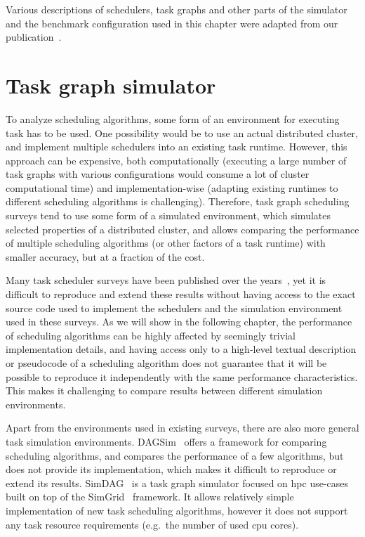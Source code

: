 Various descriptions of schedulers, task graphs and other parts of the simulator and the benchmark
configuration used in this chapter were adapted from our publication~\cite{estee}.


\section{Task graph simulator}
\label{sec:estee-simulator}
To analyze scheduling algorithms, some form of an environment for executing task has to be used.
One possibility would be to use an actual distributed cluster, and implement multiple schedulers
into an existing task runtime. However, this approach can be expensive, both computationally
(executing a large number of task graphs with various configurations would consume a lot of cluster
computational time) and implementation-wise (adapting existing runtimes to different scheduling
algorithms is challenging). Therefore, task graph scheduling surveys tend to use some form of a
simulated environment, which simulates selected properties of a distributed cluster, and allows
comparing the performance of multiple scheduling algorithms (or other factors of a task runtime)
with smaller accuracy, but at a fraction of the  cost.

Many task scheduler surveys have been published over the years~\cite{hlfet1974, kwok1998benchmarking, hagras2003static, sinnen2005, wang2018list}, yet it is
difficult to reproduce and extend these results without having access to the exact source code used
to implement the schedulers and the simulation environment used in these surveys. As we will show
in the following chapter, the performance of scheduling algorithms can be highly affected by
seemingly trivial implementation details, and having access only to a high-level textual
description or pseudocode of a scheduling algorithm does not guarantee that it will be possible to
reproduce it independently with the same performance characteristics. This makes it challenging to
compare results between different simulation environments.

Apart from the environments used in existing surveys, there are also more general task simulation
environments. DAGSim~\cite{dagsim} offers a framework for comparing scheduling
algorithms, and compares the performance of a few algorithms, but does not provide its
implementation, which makes it difficult to reproduce or extend its results.
SimDAG~\cite{simdag} is a task graph simulator focused on \gls{hpc}
use-cases built on top of the SimGrid~\cite{simgrid} framework. It allows relatively
simple implementation of new task scheduling algorithms, however it does not support any task
resource requirements (e.g.\ the number of used \gls{cpu} cores).

